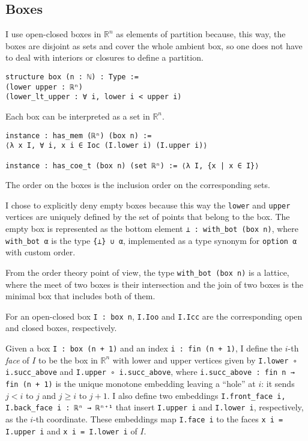 \documentclass[a4paper, UKenglish,cleveref, autoref, thm-restate]{lipics-v2021}
\newcommand{\bbR}{\mathbb{R}}
\begin{document}
\subsection{Boxes}\label{sec:boxes}

I use open-closed boxes in \(\bbR^{n}\) as elements of partition
because, this way, the boxes are disjoint as sets and cover the whole
ambient box, so one does not have to deal with interiors or closures
to define a partition.

\begin{lstlisting}
structure box (n : ℕ) : Type :=
(lower upper : ℝⁿ)
(lower_lt_upper : ∀ i, lower i < upper i)
\end{lstlisting}

Each box can be interpreted as a set in \(\bbR^{n}\).
\begin{lstlisting}
instance : has_mem (ℝⁿ) (box n) :=
⟨λ x I, ∀ i, x i ∈ Ioc (I.lower i) (I.upper i)⟩

instance : has_coe_t (box n) (set ℝⁿ) := ⟨λ I, {x | x ∈ I}⟩
\end{lstlisting}
The order on the boxes is the inclusion order on the corresponding
sets.

I chose to explicitly deny empty boxes because this way the
\lstinline{lower} and \lstinline{upper} vertices are uniquely defined
by the set of points that belong to the box. The empty box is
represented as the bottom element \lstinline{⊥ : with_bot (box n)},
where \lstinline{with_bot α} is the type \lstinline={⊥} ∪ α=,
implemented as a type synonym for \lstinline{option α} with custom order.

From the order theory point of view, the type
\lstinline=with_bot (box n)= is a lattice, where the meet of two boxes
is their intersection and the join of two boxes is the minimal box
that includes both of them.

For an open-closed box \lstinline{I : box n}, \lstinline{I.Ioo} and
\lstinline{I.Icc} are the corresponding open and closed boxes,
respectively.

Given a box \lstinline=I : box (n + 1)= and an index
\lstinline=i : fin (n + 1)=, I define the \(i\)-th \emph{face} of
\(I\) to be the box in \(\bbR^{n}\) with lower and upper vertices given by
\lstinline=I.lower ∘ i.succ_above= and
\lstinline=I.upper ∘ i.succ_above=, where
\lstinline=i.succ_above : fin n → fin (n + 1)= is the unique monotone
embedding leaving a \enquote{hole} at \(i\): it sends \(j<i\) to \(j\)
and \(j\ge i\) to \(j+1\). I also define two embeddings
\lstinline=I.front_face i, I.back_face i : ℝⁿ → ℝⁿ⁺¹= that insert
\lstinline=I.upper i= and \lstinline=I.lower i=, respectively, as the
\(i\)-th coordinate. These embeddings map \lstinline=I.face i= to
the faces \lstinline+x i = I.upper i+ and \lstinline+x i = I.lower i+
of \(I\).
\end{document}
